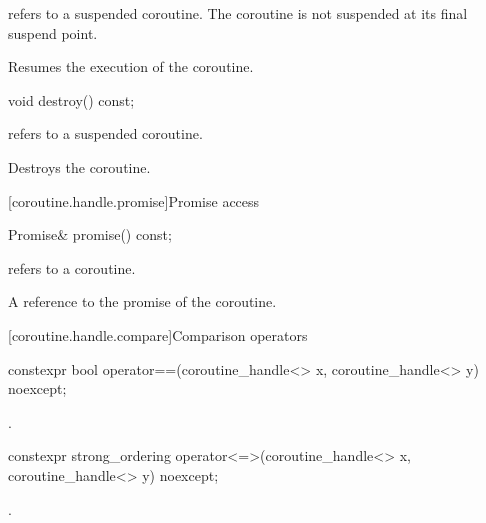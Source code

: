 \begin{itemdescr}
\pnum
\expects
{} refers to a suspended coroutine.
The coroutine is not suspended at its final suspend point.

\pnum
\effects
Resumes the execution of the coroutine.
\end{itemdescr}

%
\begin{itemdecl}
void destroy() const;
\end{itemdecl}

\begin{itemdescr}
\pnum
\expects
{} refers to a suspended coroutine.

\pnum
\effects
Destroys the coroutine.
\end{itemdescr}

[coroutine.handle.promise]{Promise access}

%
\begin{itemdecl}
Promise& promise() const;
\end{itemdecl}

\begin{itemdescr}
\pnum
\expects
{} refers to a coroutine.

\pnum
\returns
A reference to the promise of the coroutine.
\end{itemdescr}

[coroutine.handle.compare]{Comparison operators}

%
%
\begin{itemdecl}
constexpr bool operator==(coroutine_handle<> x, coroutine_handle<> y) noexcept;
\end{itemdecl}

\begin{itemdescr}
\pnum
\returns
{}.
\end{itemdescr}

%
\begin{itemdecl}
constexpr strong_ordering operator<=>(coroutine_handle<> x, coroutine_handle<> y) noexcept;
\end{itemdecl}

\begin{itemdescr}
\pnum
\returns
{}.
\end{itemdescr}

